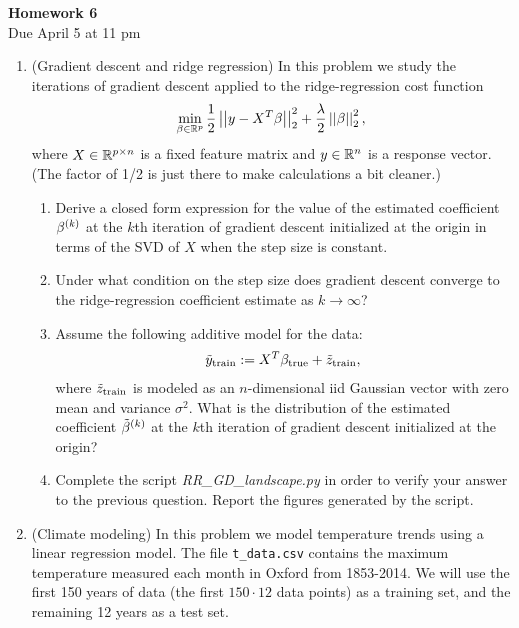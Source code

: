 \documentclass[12pt,twoside]{article}
\begin{document}
\begin{center}
{\large{\textbf{Homework 6}} } \vspace{0.2cm}\\
Due April 5 at 11 pm
\end{center}

\begin{enumerate}

\item (Gradient descent and ridge regression) In this problem we study the iterations of gradient descent applied to the ridge-regression cost function
\begin{align}
\min_{\beta \in \mathbb{R}^p} \frac{1}{2}\left|\left| y-X^T\beta \right|\right| _{2}^2 + \frac{\lambda}{2}\left|\left| \beta \right|\right| _{2}^2,
\end{align}
where $X \in \mathbb{R}^{p \times n}$ is a fixed feature matrix and $y\in \mathbb{R}^{n}$ is a response vector. (The factor of 1/2 is just there to make calculations a bit cleaner.)
\begin{enumerate}
\item Derive a closed form expression for the value of the estimated coefficient $\beta^{\left( k \right)}$ at the $k$th iteration of gradient descent initialized at the origin in terms of the SVD of $X$ when the step size is constant. 
\item Under what condition on the step size does gradient descent converge to the ridge-regression coefficient estimate as $k \rightarrow \infty$?
\item Assume the following additive model for the data:  
\begin{align}
\tilde{  y }_{\operatorname{train}} := X^T \beta_{\operatorname{true}} + \tilde{ z }_{\operatorname{train}},
\end{align}
where $\tilde{ z }_{\operatorname{train}}$ is modeled as an $n$-dimensional iid Gaussian vector with zero mean and variance $\sigma^2$. What is the distribution of the estimated coefficient $\tilde{ \beta }^{\left( k \right)}$ at the $k$th iteration of gradient descent initialized at the origin?
\item Complete the script \emph{RR\_GD\_landscape.py} in order to verify your answer to the previous question. Report the figures generated by the script.
\end{enumerate}
 
\item  (Climate modeling) In this problem we model temperature trends using a linear regression model. The file 
\texttt{t\_data.csv} contains the maximum temperature measured
  each month in Oxford from 1853-2014.  We will use the first
  150 years of data (the first $150\cdot 12$ data points) as a training set, and
  the remaining 12 years as a test set.


\end{enumerate}
\end{document}
